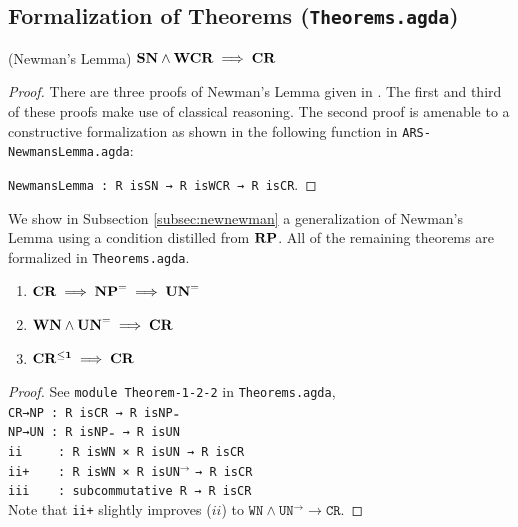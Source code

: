 
\subsection{Formalization of Theorems (\texttt{Theorems.agda})} \label{subsec:theorems}

\begin{theorem}(Newman's Lemma)
  $\mathbf{SN} \land \mathbf{WCR} \implies \mathbf{CR}$
\end{theorem}

\begin{proof}
  There are three proofs of Newman's Lemma given in \terese.
  The first and third of these proofs make use of classical reasoning. The second proof is amenable to a
  constructive formalization as shown in the following function in \texttt{ARS-NewmansLemma.agda}:

  \verb|NewmansLemma : R isSN → R isWCR → R isCR|.
\end{proof}

  We show in Subsection \ref{subsec:newnewman} a generalization of Newman's Lemma using a condition distilled from $\mathbf{RP}$.
  All of the remaining theorems are formalized in \texttt{Theorems.agda}.

\begin{theorem} \hfill 
\begin{enumerate}[label=\roman*.]
  \item $\mathbf{CR} \implies \mathbf{NP}^{=} \implies \mathbf{UN}^{=}$
  \item $\mathbf{WN} \land \mathbf{UN}^{=} \implies \mathbf{CR}$
  \item $\mathbf{CR^{\le 1}} \implies \mathbf{CR}$
\end{enumerate}
\end{theorem}

\begin{proof}
    See \texttt{module Theorem-1-2-2} in \texttt{Theorems.agda}, \\
    \verb|CR→NP : R isCR → R isNP₌|\\
    \verb|NP→UN : R isNP₌ → R isUN|\\
    \verb|ii     : R isWN × R isUN → R isCR|\\
    \verb|ii+    : R isWN × R |\texttt{isUN}$^{\to}$ \verb|→ R isCR|\\
    \verb|iii    : subcommutative R → R isCR|\\
    Note that \verb|ii+| slightly improves ($ii$) to $\mathtt{WN∧UN^{→}→CR}$.
\end{proof}

